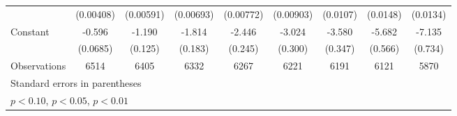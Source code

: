 \begin{table}[htbp]
\begin{tabular}{l*{8}{c}}
                    &   (0.00408)         &   (0.00591)         &   (0.00693)         &   (0.00772)         &   (0.00903)         &    (0.0107)         &    (0.0148)         &    (0.0134)         \\
[1em]
Constant            &      -0.596\sym{***}&      -1.190\sym{***}&      -1.814\sym{***}&      -2.446\sym{***}&      -3.024\sym{***}&      -3.580\sym{***}&      -5.682\sym{***}&      -7.135\sym{***}\\
                    &    (0.0685)         &     (0.125)         &     (0.183)         &     (0.245)         &     (0.300)         &     (0.347)         &     (0.566)         &     (0.734)         \\
\hline
Observations        &        6514         &        6405         &        6332         &        6267         &        6221         &        6191         &        6121         &        5870         \\
\hline\hline
\multicolumn{9}{l}{\footnotesize Standard errors in parentheses}\\
\multicolumn{9}{l}{\footnotesize \sym{*} \(p<0.10\), \sym{**} \(p<0.05\), \sym{***} \(p<0.01\)}\\
\end{tabular}
\end{table}
